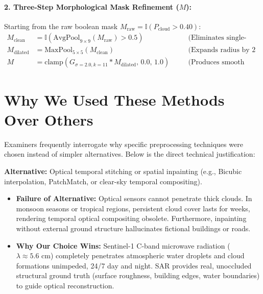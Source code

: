 \documentclass[11pt,a4paper]{article}
\begin{document}
\paragraph{2. Three-Step Morphological Mask Refinement ($M$):}
Starting from the raw boolean mask $M_{\text{raw}} = \mathbb{I}(P_{\text{cloud}} > 0.40)$:
\begin{align}
M_{\text{clean}} &= \mathbb{I}\left( \text{AvgPool}_{9\times 9}(M_{\text{raw}}) > 0.5 \right) \quad &&\text{(Eliminates single-pixel noise)}\\
M_{\text{dilated}} &= \text{MaxPool}_{5\times 5}(M_{\text{clean}}) \quad &&\text{(Expands radius by 2 pixels over thin haze)}\\
M &= \text{clamp}\left( G_{\sigma=2.0, k=11} * M_{\text{dilated}}, \, 0.0, \, 1.0 \right) \quad &&\text{(Produces smooth continuous soft boundary)}
\end{align}

\section{Why We Used These Methods Over Others}

Examiners frequently interrogate why specific preprocessing techniques were chosen instead of simpler alternatives. Below is the direct technical justification:

\begin{tcolorbox}[colback=white,colframe=primary,title=\textbf{1. Why Multi-Modal SAR (Radar) + Optical instead of Optical-Only Interpolation?}]
\textbf{Alternative:} Optical temporal stitching or spatial inpainting (e.g., Bicubic interpolation, PatchMatch, or clear-sky temporal compositing).
\begin{itemize}[leftmargin=1.2em, itemsep=0.2em]
    \item \textbf{Failure of Alternative:} Optical sensors cannot penetrate thick clouds. In monsoon seasons or tropical regions, persistent cloud cover lasts for weeks, rendering temporal optical compositing obsolete. Furthermore, inpainting without external ground structure hallucinates fictional buildings or roads.
    \item \textbf{Why Our Choice Wins:} Sentinel-1 C-band microwave radiation ($\lambda \approx 5.6\text{ cm}$) completely penetrates atmospheric water droplets and cloud formations unimpeded, 24/7 day and night. SAR provides real, unoccluded structural ground truth (surface roughness, building edges, water boundaries) to guide optical reconstruction.
\end{itemize}
\end{tcolorbox}
\end{document}
